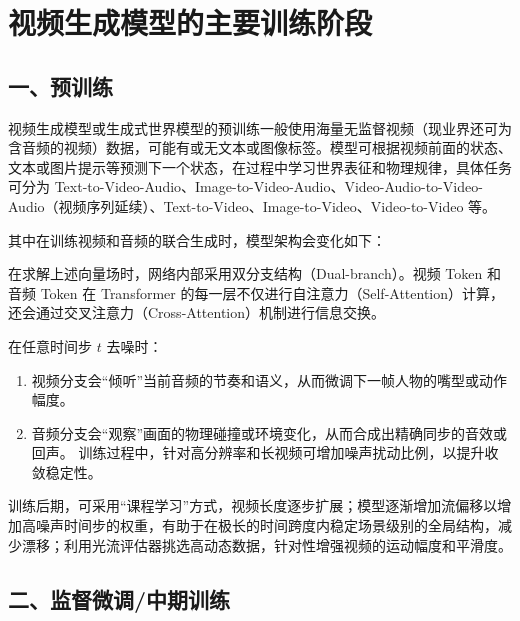 \setcounter{section}{1}

\hypertarget{ux89c6ux9891ux751fux6210ux6a21ux578bux7684ux4e3bux8981ux8badux7ec3ux9636ux6bb5}{%
\section{视频生成模型的主要训练阶段}\label{ux89c6ux9891ux751fux6210ux6a21ux578bux7684ux4e3bux8981ux8badux7ec3ux9636ux6bb5}}

\hypertarget{ux4e00ux9884ux8badux7ec3}{%
\subsection{一、预训练}\label{ux4e00ux9884ux8badux7ec3}}

视频生成模型或生成式世界模型的预训练一般使用海量无监督视频（现业界还可为含音频的视频）数据，可能有或无文本或图像标签。模型可根据视频前面的状态、文本或图片提示等预测下一个状态，在过程中学习世界表征和物理规律，具体任务可分为 Text-to-Video-Audio、Image-to-Video-Audio、Video-Audio-to-Video-Audio（视频序列延续）、Text-to-Video、Image-to-Video、Video-to-Video 等。

其中在训练视频和音频的联合生成时，模型架构会变化如下：

在求解上述向量场时，网络内部采用双分支结构（Dual-branch）。视频 Token 和音频 Token 在 Transformer 的每一层不仅进行自注意力（Self-Attention）计算，还会通过交叉注意力（Cross-Attention）机制进行信息交换。

在任意时间步 \(t\) 去噪时：

\begin{enumerate}
\def\labelenumi{\arabic{enumi}.}
\item
  视频分支会``倾听''当前音频的节奏和语义，从而微调下一帧人物的嘴型或动作幅度。
\item
  音频分支会``观察''画面的物理碰撞或环境变化，从而合成出精确同步的音效或回声。
  训练过程中，针对高分辨率和长视频可增加噪声扰动比例，以提升收敛稳定性。
\end{enumerate}

训练后期，可采用``课程学习''方式，视频长度逐步扩展；模型逐渐增加流偏移以增加高噪声时间步的权重，有助于在极长的时间跨度内稳定场景级别的全局结构，减少漂移；利用光流评估器挑选高动态数据，针对性增强视频的运动幅度和平滑度。

\hypertarget{ux4e8cux76d1ux7763ux5faeux8c03ux4e2dux671fux8badux7ec3}{%
\subsection{二、监督微调/中期训练}\label{ux4e8cux76d1ux7763ux5faeux8c03ux4e2dux671fux8badux7ec3}}

